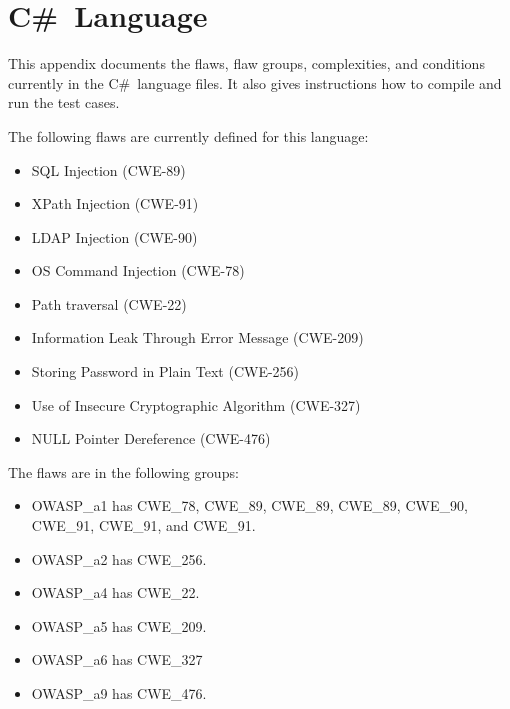 \documentclass[12pt]{article}
\newcommand{\CSharp}{C{\fontseries{b}\selectfont\#}}
\begin{document}



\newpage

%
%

\clearpage

\appendix

\section{\CSharp\ Language}
\label{sec:CSharp language}

This appendix documents the flaws, flaw groups, complexities, and conditions
currently in the
\CSharp\ language files.
It also gives instructions how to compile and run the test cases.

The following flaws are currently defined for this language:
\begin{itemize}[nosep]
    \item SQL Injection (CWE-89)
    \item XPath Injection (CWE-91)
    \item LDAP Injection (CWE-90)
    \item OS Command Injection (CWE-78)
    \item Path traversal (CWE-22)
    \item Information Leak Through Error Message (CWE-209)
    \item Storing Password in Plain Text (CWE-256)
    \item Use of Insecure Cryptographic Algorithm (CWE-327)
    \item NULL Pointer Dereference (CWE-476)
\end{itemize}

\vspace{1em}

The flaws are in the following groups:
\begin{itemize}[nosep]
    \item OWASP\_a1 has CWE\_78, CWE\_89, CWE\_89, CWE\_89, CWE\_90, CWE\_91,
      CWE\_91, and CWE\_91.
    \item OWASP\_a2 has CWE\_256.
    \item OWASP\_a4 has CWE\_22.
    \item OWASP\_a5 has CWE\_209.
    \item OWASP\_a6 has CWE\_327
    \item OWASP\_a9 has CWE\_476.
\end{itemize}
\end{document}
